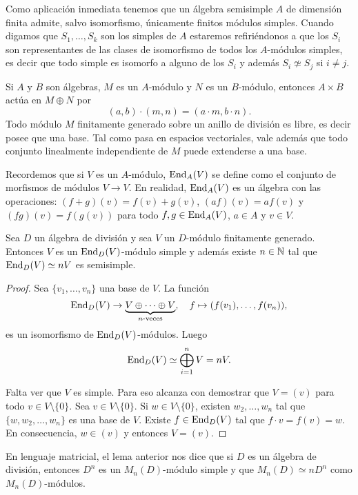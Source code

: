 Como aplicación inmediata tenemos que
un álgebra semisimple $A$ de dimensión finita admite, salvo isomorfismo, únicamente finitos módulos simples. Cuando digamos
que $S_1,\dots,S_k$ son los simples de $A$ estaremos refiriéndonos a que los $S_i$ son 
representantes de las clases de isomorfismo de todos los $A$-módulos simples, es decir 
que todo simple es isomorfo a alguno de los $S_i$ y además 
$S_i\not\simeq S_j$ si $i\ne j$. 

\medskip
Si $A$ y $B$ son álgebras, $M$ es un $A$-módulo y $N$ es un $B$-módulo, entonces
$A\times B$ actúa en $M\oplus N$ por
\[
(a,b)\cdot (m,n)=(a\cdot m,b\cdot n).
\]
Todo módulo $M$ finitamente generado sobre un anillo de división es libre, es decir
posee que una base. Tal como pasa en espacios vectoriales, vale además que
todo conjunto linealmente independiente de $M$ puede extenderse a una base.  

\medskip
Recordemos que si $V$ es un $A$-módulo, $\operatorname{End}_A(V)$ se define como el 
conjunto de morfismos de módulos $V\to V$. En realidad, 
$\operatorname{End}_A(V)$ es un álgebra con las operaciones: $(f+g)(v)=f(v)+g(v)$, 
$(af)(v)=af(v)$ y $(fg)(v)=f(g(v))$ para todo $f,g\in\operatorname{End}_A(V)$, $a\in A$ y $v\in V$. 

\begin{lemma}
	Sea $D$ un álgebra de división y sea $V$ un $D$-módulo finitamente generado. Entonces
	$V$ es un $\operatorname{End}_D(V)$-módulo simple y además existe $n\in\mathbb{N}$ tal que 
	$\operatorname{End}_D(V)\simeq nV$ es semisimple.
\end{lemma}

\begin{proof}
	Sea $\{v_1,\dots,v_n\}$ una base de $V$. La función
	\[
		\operatorname{End}_D(V)\to \underbrace{V\oplus\cdots\oplus V}_{\text{$n$-veces}},\quad
		f\mapsto (f(v_1),\dots,f(v_n)),
	\]
	es un isomorfismo de $\operatorname{End}_D(V)$-módulos. Luego 
	\[
		\operatorname{End}_D(V)\simeq \bigoplus_{i=1}^n V=nV.
	\]
	
	Falta ver que $V$ es simple. Para eso alcanza con demostrar que $V=(v)$ 
	para todo $v\in V\setminus\{0\}$. Sea $v\in V\setminus\{0\}$. 
	Si $w\in V\setminus\{0\}$, existen $w_2,\dots,w_n$ tal que $\{w,w_2,\dots,w_n\}$ 
	es una base de $V$. Existe $f\in\operatorname{End}_D(V)$ tal que
	$f\cdot v=f(v)=w$. En consecuencia, $w\in (v)$ y entonces $V=(v)$.  
\end{proof}

En lenguaje matricial, el lema anterior nos dice que si $D$ es un álgebra de división, entonces 
$D^{n}$ es un $M_n(D)$-módulo simple y que $M_n(D)\simeq n D^n$ como $M_n(D)$-módulos. 

